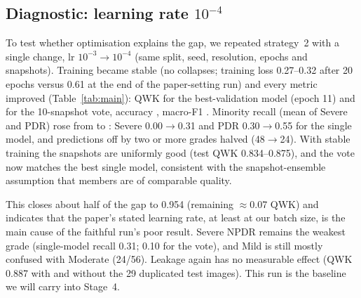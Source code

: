 \subsection{Diagnostic: learning rate $10^{-4}$}
To test whether optimisation explains the gap, we repeated strategy~2 with a single change, lr
$10^{-3}\to10^{-4}$ (same split, seed, resolution, epochs and snapshots). Training became stable (no collapses;
training loss 0.27--0.32 after 20 epochs versus 0.61 at the end of the paper-setting run) and every
metric improved (Table~\ref{tab:main}): QWK \SIIlowBestQWK{} for the best-validation model (epoch 11) and
\SIIlowVoteQWK{} for the 10-snapshot vote, accuracy \SIIlowVoteAcc{}, macro-F1 \SIIlowBestMF{}.
Minority recall (mean of Severe and PDR) rose from \SIIBestMinRec{} to \SIIlowBestMinRec{}: Severe 0.00$\to$0.31
and PDR 0.30$\to$0.55 for the single model, and predictions off by two or more grades halved (48$\to$24).
With stable training the snapshots are uniformly good (test QWK 0.834--0.875), and the vote now matches the
best single model, consistent with the snapshot-ensemble assumption that members are of comparable quality.

This closes about half of the gap to 0.954 (remaining $\approx$0.07 QWK) and indicates that the paper's stated
learning rate, at least at our batch size, is the main cause of the faithful run's poor result. Severe NPDR
remains the weakest grade (single-model recall 0.31; 0.10 for the vote), and Mild is still mostly confused with
Moderate (24/56). Leakage again has no measurable effect (QWK 0.887 with and without the 29 duplicated test
images). This run is the baseline we will carry into Stage~4.
